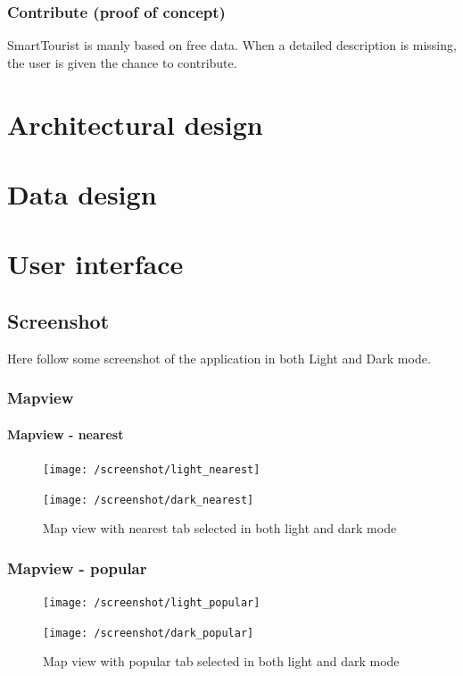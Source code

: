 \documentclass[a4paper, 11pt, parskip=half]{scrreprt}
\theoremstyle{definition}
\begin{document}
\subsection{Contribute (proof of concept)}
SmartTourist is manly based on free data. When a detailed description is missing, the user is given the chance to contribute.


\chapter{Architectural design}




\chapter{Data design}




\chapter{User interface}
\section{Screenshot}
Here follow some screenshot of the application in both Light and Dark mode.

\subsection{Mapview}
\subsubsection{Mapview - nearest}
\begin{figure}[H]
	\centering
	\begin{minipage}{.5\textwidth}
  	\centering
  	\texttt{[image: /screenshot/light\_nearest]}
  	\label{fig:test1}
	\end{minipage}%
	\begin{minipage}{.5\textwidth}
  	\centering
  	\texttt{[image: /screenshot/dark\_nearest]}
  	\label{fig:test2}
	\end{minipage}
	\caption{Map view with nearest tab selected in both light and dark mode}
\end{figure}

\subsection{Mapview - popular}
\begin{figure}[H]
	\centering
	\begin{minipage}{.5\textwidth}
  	\centering
  	\texttt{[image: /screenshot/light\_popular]}
  	\label{fig:test1}
	\end{minipage}%
	\begin{minipage}{.5\textwidth}
  	\centering
  	\texttt{[image: /screenshot/dark\_popular]}
  	\label{fig:test2}
	\end{minipage}
	\caption{Map view with popular tab selected in both light and dark mode}
\end{figure}
\end{document}
